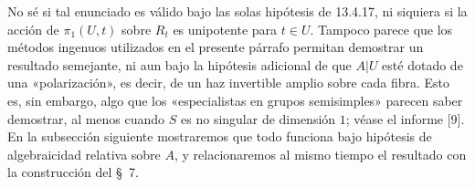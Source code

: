 No sé si tal enunciado es válido bajo las solas hipótesis de 13.4.17,
ni siquiera si la acción de $\pi_1(U,t)$ sobre $R_t$ es unipotente para
$t\in U$. Tampoco parece que los métodos ingenuos utilizados en el
presente párrafo permitan demostrar un resultado semejante, ni aun
bajo la hipótesis adicional de que $A|U$ esté dotado de una
«polarización», es decir, de un haz invertible amplio sobre cada fibra.
Esto es, sin embargo, algo que los «especialistas en grupos
semisimples» parecen saber demostrar, al menos cuando $S$ es no singular
de dimensión $1$; véase el informe [9]. En la subsección siguiente
mostraremos que todo funciona bajo hipótesis de algebraicidad relativa
sobre $A$, y relacionaremos al mismo tiempo el resultado con la
construcción del \S~7.
